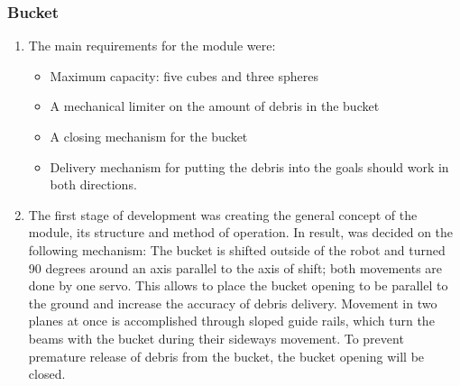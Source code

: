\subsubsection{Bucket}

  \begin{enumerate}
    \item The main requirements for the module were:
  	  \begin{itemize}
        \item Maximum capacity: five cubes and three spheres
        \item A mechanical limiter on the amount of debris in the bucket 
        \item A closing mechanism for the bucket
        \item Delivery mechanism for putting the debris into the goals should work in both directions.  
  	  \end{itemize}  
    \item The first stage of development was creating the general concept of the module, its structure and method of operation. In result, was decided on the following mechanism: 
    The bucket is shifted outside of the robot and turned 90 degrees around an axis parallel to the axis of shift;
    both movements are done by one servo.
    This allows to place the bucket opening to be parallel to the ground and increase the accuracy of debris delivery. Movement in two planes at once is accomplished through sloped guide rails, which turn the beams with the bucket during their sideways movement. To prevent premature release of debris from the bucket, the bucket opening will be closed. 
    

\end{enumerate}
